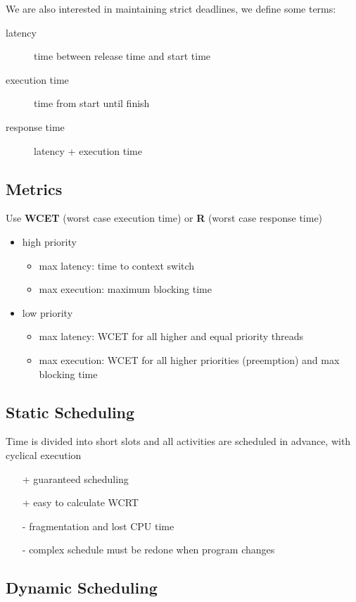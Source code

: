 \documentclass[]{article}
\theoremstyle{definition}
\begin{document}
	We are also interested in maintaining strict deadlines, we define some terms:
	\begin{description}
		\item[latency] time between release time and start time
		\item[execution time] time from start until finish
		\item[response time] latency + execution time
	\end{description}

	\subsection{Metrics}
	Use \textbf{WCET} (worst case execution time) or \textbf{R} (worst case response time)
	\begin{itemize}
		\item high priority
			\begin{itemize}
				\item max latency: time to context switch
				\item max execution: maximum blocking time
			\end{itemize}
		\item low priority
			\begin{itemize}
				\item max latency: WCET for all higher and equal priority threads
				\item max execution: WCET for all higher priorities (preemption) and max blocking time
			\end{itemize}
	\end{itemize}

	\subsection{Static Scheduling}
	Time is divided into short slots and all activities are scheduled in advance, with cyclical execution
	\begin{itemize}
		\item[+] guaranteed scheduling
		\item[+] easy to calculate WCRT
		\item[-] fragmentation and lost CPU time
		\item[-] complex schedule must be redone when program changes
	\end{itemize}

	\subsection{Dynamic Scheduling}
\end{document}
